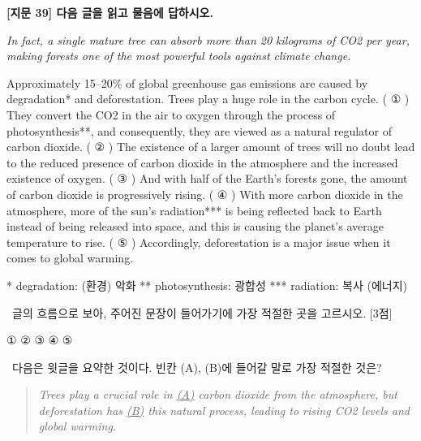 \documentclass[11pt,a4paper]{article}
\newcommand{\qno}[1]{\par\vspace{8pt}\noindent{\sffamily\bfseries #1.}\ }
\newcommand{\instr}[1]{{\sffamily #1}\par\vspace{3pt}}
\begin{document}
\begin{center}
{\fontsize{15}{17}\selectfont\sffamily\bfseries [지문 39] 다음 글을 읽고 물음에 답하시오.}
\end{center}
\vspace{4pt}

\begin{pbox}
\noindent\textit{In fact, a single mature tree can absorb more than 20 kilograms of CO2 per year,
making forests one of the most powerful tools against climate change.}
\end{pbox}

\vspace{4pt}

\begin{pbox}
Approximately 15--20\% of global greenhouse gas emissions are caused by
degradation* and deforestation. Trees play a huge role in the carbon cycle.
( ① ) They convert the CO2 in the air to oxygen through the process of
photosynthesis**, and consequently, they are viewed as a natural regulator of
carbon dioxide. ( ② ) The existence of a larger amount of trees will no doubt
lead to the reduced presence of carbon dioxide in the atmosphere and the
increased existence of oxygen. ( ③ ) And with half of the Earth's forests gone,
the amount of carbon dioxide is progressively rising. ( ④ ) With more carbon
dioxide in the atmosphere, more of the sun's radiation*** is being reflected back
to Earth instead of being released into space, and this is causing the planet's
average temperature to rise. ( ⑤ ) Accordingly, deforestation is a major issue
when it comes to global warming.

\medskip
\footnotesize
* degradation: (환경) 악화\quad
** photosynthesis: 광합성\quad
*** radiation: 복사 (에너지)
\end{pbox}

\qno{1}\instr{글의 흐름으로 보아, 주어진 문장이 들어가기에 가장 적절한 곳을 고르시오. [3점]}
\begin{choices}
\item ① \quad ② \quad ③ \quad ④ \quad ⑤
\end{choices}

\qno{2}\instr{다음은 윗글을 요약한 것이다. 빈칸 (A), (B)에 들어갈 말로 가장 적절한 것은?}

\begin{quote}
\itshape
Trees play a crucial role in \underline{\quad(A)\quad} carbon dioxide from the
atmosphere, but deforestation has \underline{\quad(B)\quad} this natural process,
leading to rising CO2 levels and global warming.
\end{quote}
\end{document}
